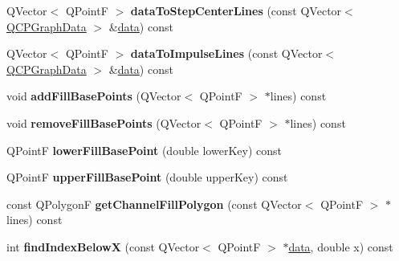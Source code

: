 \begin{DoxyCompactItemize}
\item 
\mbox{\label{class_q_c_p_graph_a238116f1898c49cb8209d61707b5b367}} 
Q\+Vector$<$ Q\+PointF $>$ {\bfseries data\+To\+Step\+Center\+Lines} (const Q\+Vector$<$ \hyperlink{class_q_c_p_graph_data}{Q\+C\+P\+Graph\+Data} $>$ \&\hyperlink{class_q_c_p_graph_a141aa31a1f19bbd0ce60f55eaeb9ea60}{data}) const
\item 
\mbox{\label{class_q_c_p_graph_a2a958a5c6a6e1e4a03556be88b6fe37e}} 
Q\+Vector$<$ Q\+PointF $>$ {\bfseries data\+To\+Impulse\+Lines} (const Q\+Vector$<$ \hyperlink{class_q_c_p_graph_data}{Q\+C\+P\+Graph\+Data} $>$ \&\hyperlink{class_q_c_p_graph_a141aa31a1f19bbd0ce60f55eaeb9ea60}{data}) const
\item 
\mbox{\label{class_q_c_p_graph_af9d33e4a001e5c3c695395cd7b365448}} 
void {\bfseries add\+Fill\+Base\+Points} (Q\+Vector$<$ Q\+PointF $>$ $\ast$lines) const
\item 
\mbox{\label{class_q_c_p_graph_a6f433c2b9dce8e6fae31780143e85520}} 
void {\bfseries remove\+Fill\+Base\+Points} (Q\+Vector$<$ Q\+PointF $>$ $\ast$lines) const
\item 
\mbox{\label{class_q_c_p_graph_ace7c17a07e9aa824853e469816a5aa1c}} 
Q\+PointF {\bfseries lower\+Fill\+Base\+Point} (double lower\+Key) const
\item 
\mbox{\label{class_q_c_p_graph_a7a255fc7260d96ed6f9d972839941f93}} 
Q\+PointF {\bfseries upper\+Fill\+Base\+Point} (double upper\+Key) const
\item 
\mbox{\label{class_q_c_p_graph_ace6fb42e60633f29b8071e40133eda50}} 
const Q\+PolygonF {\bfseries get\+Channel\+Fill\+Polygon} (const Q\+Vector$<$ Q\+PointF $>$ $\ast$lines) const
\item 
\mbox{\label{class_q_c_p_graph_a8c3f15dd5a06633011a6ef36016d308b}} 
int {\bfseries find\+Index\+BelowX} (const Q\+Vector$<$ Q\+PointF $>$ $\ast$\hyperlink{class_q_c_p_graph_a141aa31a1f19bbd0ce60f55eaeb9ea60}{data}, double x) const
\item 
\mbox{\label{class_q_c_p_graph_aaabd6c6a7200a2672c44e62bd2a1cafa}} 

\end{DoxyCompactItemize}
